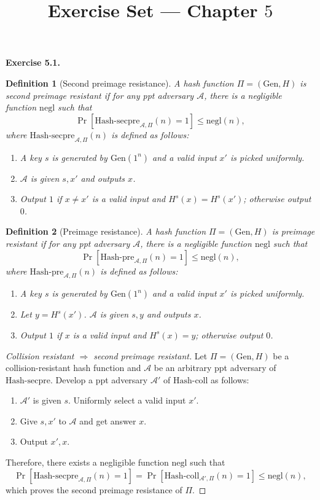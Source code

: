 \documentclass[a4paper]{article}
\title{Exercise Set --- Chapter $5$}
\date{}
\newtheorem{definition}{Definition}
\newtheorem*{proof}{Proof}
\newenvironment{exercise}[1]{
	\par
	\noindent\textbf{Exercise #1.}\quad
}{
	\par
	\bigskip
}
\newcommand{\sbra}[1]{\left[ #1 \right]}
\newcommand{\Gen}{\mathrm{Gen}}
\newcommand{\Hashcoll}{\mathrm{Hash}\text{-}\mathrm{coll}}
\newcommand{\negl}{\mathrm{negl}}
\newcommand{\ppt}{{\sc ppt} }
\newcommand{\Acal}{\mathcal{A}}
\begin{document}
\maketitle

\begin{exercise}{5.1}
\begin{definition}[Second preimage resistance]
    A hash function $\Pi=(\Gen,H)$ 
    is \emph{second preimage resistant} if for any \ppt adversary $\Acal$, there is a 
    negligible function $\negl$ such that
    $$\Pr\sbra{\mathrm{Hash\text{-}secpre}_{\Acal,\Pi}(n)=1}\leq\negl(n),$$
    where $\mathrm{Hash\text{-}secpre}_{\Acal,\Pi}(n)$ is defined as follows:
    \begin{enumerate}
        \item A key $s$ is generated by $\Gen(1^n)$ and a valid input $x'$ is picked uniformly.
        \item $\Acal$ is given $s,x'$ and outputs $x$.
        \item Output $1$ if $x\neq x'$ is a valid input and $H^s(x)=H^s(x')$; otherwise output $0$.
    \end{enumerate}
\end{definition}

\begin{definition}[Preimage resistance]
    A hash function $\Pi=(\Gen,H)$ 
    is \emph{preimage resistant} if for any \ppt adversary $\Acal$, there is a 
    negligible function $\negl$ such that
    $$\Pr\sbra{\mathrm{Hash\text{-}pre}_{\Acal,\Pi}(n)=1}\leq\negl(n),$$
    where $\mathrm{Hash\text{-}pre}_{\Acal,\Pi}(n)$ is defined as follows:
    \begin{enumerate}
        \item A key $s$ is generated by $\Gen(1^n)$ and a valid input $x'$ is picked uniformly.
        \item Let $y=H^s(x')$. $\Acal$ is given $s,y$ and outputs $x$.
        \item Output $1$ if $x$ is a valid input and $H^s(x)=y$; otherwise output $0$.
    \end{enumerate}
\end{definition}

\begin{proof}[Collision resistant $\Rightarrow$ second preimage resistant]
    Let $\Pi=(\Gen,H)$ be a collision-resistant hash function and 
    $\Acal$ be an arbitrary \ppt adversary of $\mathrm{Hash\text{-}secpre}$.
    Develop a \ppt adversary $\Acal'$ of $\Hashcoll$ as follows:
    \begin{enumerate}
        \item $\Acal'$ is given $s$. Uniformly select a valid input $x'$.
        \item Give $s,x'$ to $\Acal$ and get answer $x$.
        \item Output $x',x$.
    \end{enumerate}
    Therefore, there exists a negligible function $\negl$ such that
    $$
        \Pr\sbra{\mathrm{Hash\text{-}secpre}_{\Acal,\Pi}(n)=1}=
        \Pr\sbra{\Hashcoll_{\Acal',\Pi}(n)=1}\leq\negl(n),
    $$
    which proves the second preimage resistance of $\Pi$.
\end{proof}


\end{exercise}
\end{document}
